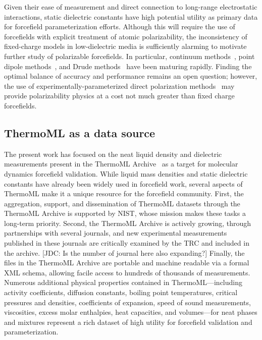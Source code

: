 \documentclass[aps,pre,twocolumn,nofootinbib,superscriptaddress,linenumbers]{revtex4-1}
\begin{document}
Given their ease of measurement and direct connection to long-range electrostatic interactions, static dielectric constants have high potential utility as primary data for forcefield parameterization efforts.  
Although this will require the use of forcefields with explicit treatment of atomic polarizability, the inconsistency of fixed-charge models in low-dielectric media is sufficiently alarming to motivate further study of polarizable forcefields.  In particular, continuum methods~\cite{truchon2010using, truchon2009integrated, truchon2008accurate}, point dipole methods~\cite{Ponder2010, ren2004temperature}, and Drude methods~\cite{lamoureux2003modeling, anisimov2005determination} have been maturing rapidly.  Finding the optimal balance of accuracy and performance remains an open question; however, the use of experimentally-parameterized direct polarization methods~\cite{wang2013systematic} may provide polarizability physics at a cost not much greater than fixed charge forcefields.


\subsection{ThermoML as a data source}

The present work has focused on the neat liquid density and dielectric measurements present in the ThermoML Archive~\cite{frenkel2006xml, frenkel2003thermoml, chirico2003thermoml} as a target for molecular dynamics forcefield validation.  
While liquid mass densities and static dielectric constants have already been widely used in forcefield work, several aspects of ThermoML make it a unique resource for the forcefield community.  
First, the aggregation, support, and dissemination of ThermoML datasets through the ThermoML Archive is supported by NIST, whose mission makes these tasks a long-term priority.  
Second, the ThermoML Archive is actively growing, through partnerships with several journals, and new experimental measurements published in these journals are critically examined by the TRC and included in the archive.  
{\color{red}[JDC: Is the number of journal here also expanding?]}
Finally, the files in the ThermoML Archive are portable and machine readable via a formal XML schema, allowing facile access to hundreds of thousands of measurements.  
Numerous additional physical properties contained in ThermoML---including activity coefficients, diffusion constants, boiling point temperatures, critical pressures and densities, coefficients of expansion, speed of sound measurements, viscosities, excess molar enthalpies, heat capacities, and volumes---for neat phases and mixtures represent a rich dataset of high utility for forcefield validation and parameterization.
\end{document}
